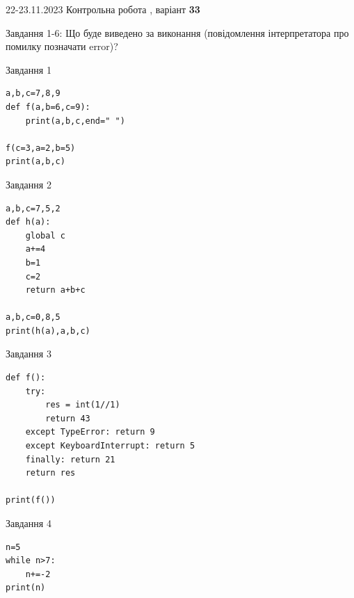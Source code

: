\documentclass[12pt, ukrainian]{article}
\begin{document}
{{22-23.11.2023 Контрольна робота , варіант  \No \textbf { 33 }\par}}
{

Завдання 1-6: Що буде виведено за виконання (повідомлення інтерпретатора про помилку позначати error)?


\begin{minipage}[t]{9.7cm}                
{\begin{center}Завдання {1}\end{center}}
\begin{verbatim}
a,b,c=7,8,9
def f(a,b=6,c=9):
    print(a,b,c,end=" ")

f(c=3,a=2,b=5)
print(a,b,c)
\end{verbatim}     
\end{minipage}
\vline \hspace{8mm}
\begin{minipage}[t]{8.0cm}                
{\begin{center}Завдання {2}\end{center}}
\begin{verbatim}
a,b,c=7,5,2
def h(a):
    global c
    a+=4
    b=1
    c=2
    return a+b+c

a,b,c=0,8,5
print(h(a),a,b,c)
\end{verbatim}     
\end{minipage}

\vspace{15mm}
\begin{minipage}[t]{9.7cm}                
{\begin{center}Завдання {3}\end{center}}
\begin{verbatim}
def f():
    try:
        res = int(1//1)
        return 43
    except TypeError: return 9
    except KeyboardInterrupt: return 5
    finally: return 21
    return res

print(f())
\end{verbatim}     
\end{minipage}
\vline \hspace{8mm}
\begin{minipage}[t]{8.0cm}                
{\begin{center}Завдання {4}\end{center}}
\begin{verbatim}
n=5
while n>7:
    n+=-2
print(n)
\end{verbatim}     
\end{minipage}

}
\end{document}
